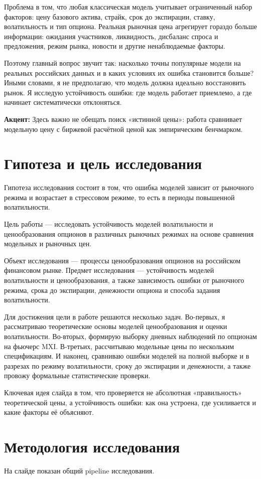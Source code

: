 \documentclass[11pt,a4paper]{article}
\newcommand{\slidetitle}[1]{\section{#1}}
\newcommand{\note}[1]{%
  \vspace{0.15em}
  \noindent\colorbox{softblue}{%
    \parbox{\dimexpr\linewidth-2\fboxsep\relax}{\textbf{Акцент:} #1}%
  }\vspace{0.25em}
}
\begin{document}
Проблема в том, что любая классическая модель учитывает ограниченный набор факторов: цену базового актива, страйк, срок до экспирации, ставку, волатильность и тип опциона. Реальная рыночная цена агрегирует гораздо больше информации: ожидания участников, ликвидность, дисбаланс спроса и предложения, режим рынка, новости и другие ненаблюдаемые факторы.

Поэтому главный вопрос звучит так: насколько точны популярные модели на реальных российских данных и в каких условиях их ошибка становится больше? Иными словами, я не предполагаю, что модель должна идеально восстановить рынок. Я исследую устойчивость ошибки: где модель работает приемлемо, а где начинает систематически отклоняться.

\note{Здесь важно не обещать поиск «истинной цены»: работа сравнивает модельную цену с биржевой расчётной ценой как эмпирическим бенчмарком.}

\slidetitle{Гипотеза и цель исследования}

Гипотеза исследования состоит в том, что ошибка моделей зависит от рыночного режима и возрастает в стрессовом режиме, то есть в периоды повышенной волатильности.

Цель работы --- исследовать устойчивость моделей волатильности и ценообразования опционов в различных рыночных режимах на основе сравнения модельных и рыночных цен.

Объект исследования --- процессы ценообразования опционов на российском финансовом рынке. Предмет исследования --- устойчивость моделей волатильности и ценообразования, а также зависимость ошибки от рыночного режима, срока до экспирации, денежности опциона и способа задания волатильности.

Для достижения цели в работе решаются несколько задач. Во-первых, я рассматриваю теоретические основы моделей ценообразования и оценки волатильности. Во-вторых, формирую выборку дневных наблюдений по опционам на фьючерс MXI. В-третьих, рассчитываю модельные цены по нескольким спецификациям. И наконец, сравниваю ошибки моделей на полной выборке и в разрезах по режиму волатильности, сроку до экспирации и денежности, а также провожу формальные статистические проверки.

Ключевая идея слайда в том, что проверяется не абсолютная «правильность» теоретической цены, а устойчивость ошибки: как она устроена, где усиливается и какие факторы её объясняют.

\slidetitle{Методология исследования}

На слайде показан общий pipeline исследования.
\end{document}
